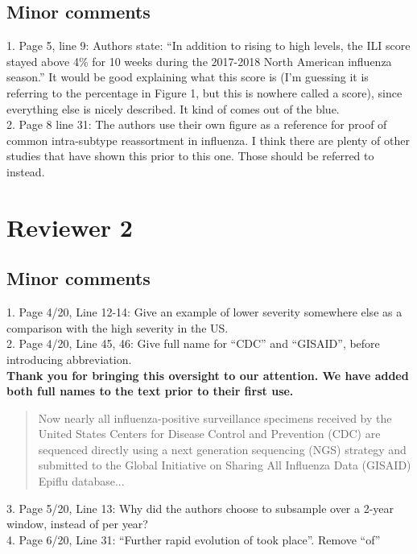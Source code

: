 \documentclass[11pt,oneside,letterpaper]{article}
\begin{document}
\subsection*{Minor comments}
1. Page 5, line 9: Authors state: “In addition to rising to high levels, the ILI score stayed above 4\% for 10 weeks during the 2017-2018 North American influenza season.” It would be good explaining what this score is (I’m guessing it is referring to the percentage in Figure 1, but this is nowhere called a score), since everything else is nicely described. It kind of comes out of the blue.\\

2. Page 8 line 31: The authors use their own figure as a reference for proof of common intra-subtype reassortment in influenza. I think there are plenty of other studies that have shown this prior to this one. Those should be referred to instead.\\

\section*{Reviewer 2}
\subsection*{Minor comments}
1. Page 4/20, Line 12-14: Give an example of lower severity somewhere else as a comparison with the high severity in the US.\\

2. Page 4/20, Line 45, 46: Give full name for “CDC” and “GISAID”, before introducing abbreviation.\\

\textbf{Thank you for bringing this oversight to our attention. We have added both full names to the text prior to their first use.}

\begin{quotation}
Now nearly all influenza-positive surveillance specimens received by the United States Centers for Disease Control and Prevention (CDC) are sequenced directly using a next generation sequencing (NGS) strategy and submitted to the Global Initiative on Sharing All Influenza Data (GISAID) Epiflu database...
\end{quotation}

3. Page 5/20, Line 13: Why did the authors choose to subsample over a 2-year window, instead of per year?\\

4. Page 6/20, Line 31: “Further rapid evolution of took place”. Remove “of”\\
\end{document}
